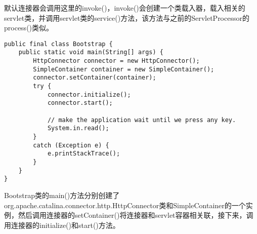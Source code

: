 \par 默认连接器会调用这里的invoke()，invoke()会创建一个类载入器，载入相关的
servlet类，并调用servlet类的service()方法，该方法与之前的ServletProcessor的process()类似。
\begin{lstlisting}
public final class Bootstrap {
	public static void main(String[] args) {
		HttpConnector connector = new HttpConnector();
		SimpleContainer container = new SimpleContainer();
		connector.setContainer(container);
		try {
			connector.initialize();
			connector.start();
			
			// make the application wait until we press any key.
			System.in.read();
		}
		catch (Exception e) {
			e.printStackTrace();
		}
	}
}
\end{lstlisting}
\par Bootstrap类的main()方法分别创建了org.apache.catalina.connector.http.HttpConnector类和SimpleContainer的一个实例，然后调用连接器的setContainer()将连接器和servlet容器相关联，接下来，调用连接器的initialize()和start()方法。